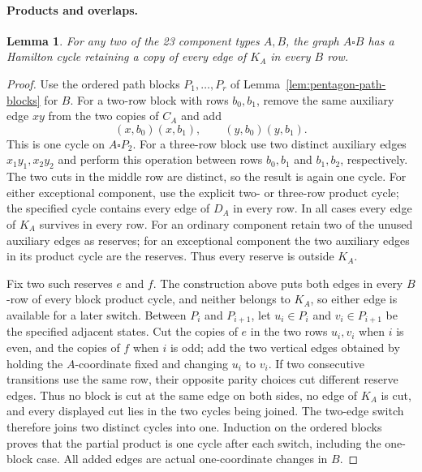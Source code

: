 \documentclass[11pt]{article}
\newtheorem{lemma}[theorem]{Lemma}
\theoremstyle{remark}
\numberwithin{equation}{section}
\numberwithin{table}{section}
\begin{document}
\paragraph{Products and overlaps.}
\begin{lemma}\label{lem:protected-product}
For any two of the 23 component types $A,B$, the graph $A\square B$
has a Hamilton cycle retaining a copy of every edge of $K_A$
in every $B$ row.
\end{lemma}
\begin{proof}
Use the ordered path blocks $P_1,\ldots,P_r$ of
Lemma~\ref{lem:pentagon-path-blocks} for $B$.  For a two-row block
with rows $b_0,b_1$, remove the same auxiliary edge $xy$ from the two
copies of $C_A$ and add
\[
 (x,b_0)(x,b_1),\qquad (y,b_0)(y,b_1).
\]
This is one cycle on $A\square P_2$.  For a three-row block use two
distinct auxiliary edges $x_1y_1,x_2y_2$ and perform this operation between
rows $b_0,b_1$ and $b_1,b_2$, respectively.  The two cuts in the
middle row are distinct, so the result is again one cycle.  For either
exceptional component, use the explicit two- or three-row product cycle; the
specified cycle contains every edge of $D_A$ in every row.  In all cases every edge of $K_A$ survives in every
row.  For an ordinary component retain two of the unused auxiliary edges
as reserves; for an exceptional component the two auxiliary edges in its product cycle are
the reserves.  Thus every reserve is outside $K_A$.

Fix two such reserves $e$ and $f$.  The construction above puts both
edges in every $B$-row of every block product cycle, and neither belongs to
$K_A$, so either
edge is available for a later switch.  Between $P_i$ and $P_{i+1}$,
let $u_i\in P_i$ and $v_i\in P_{i+1}$ be the specified adjacent
states.  Cut the copies of $e$ in the two rows $u_i,v_i$ when $i$ is
even, and the copies of $f$ when $i$ is odd; add the two vertical
edges obtained by holding the $A$-coordinate fixed and changing
$u_i$ to $v_i$.  If two consecutive transitions use the same row, their opposite parity choices cut different reserve edges.  Thus
no block is cut at the same edge on both sides, no edge of $K_A$ is
cut, and every displayed cut lies in the two cycles being joined.
The two-edge switch therefore joins two distinct cycles into one.  Induction
on the ordered blocks proves that the partial product is one cycle after
each switch, including the one-block case.  All added edges are actual
one-coordinate changes in $B$.
\end{proof}
\end{document}
